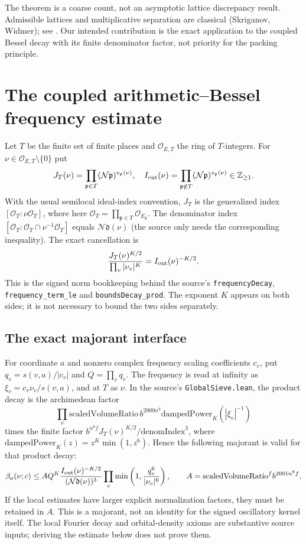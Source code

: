 \documentclass[11pt,a4paper]{article}
\newcommand{\N}{\mathcal N}\newcommand{\OO}{\mathcal O}\newcommand{\KK}{\mathscr K}\newcommand{\Tr}{\operatorname{tr}}\newcommand{\rk}{\operatorname{rank}}\newcommand{\len}{\operatorname{length}}\newcommand{\diag}{\operatorname{diag}}\newcommand{\vol}{\operatorname{vol}}\newcommand{\Id}{\mathrm I}\newcommand{\vG}{v_{\mathrm G}}\newcommand{\supp}{\operatorname{supp}}\newcommand{\status}[1]{\par\smallskip\noindent\textit{Status.} #1\par\smallskip}
\begin{document}
The theorem is a coarse count, not an asymptotic lattice discrepancy result. Admissible lattices and multiplicative separation are classical (Skriganov, Widmer); see \cite{skriganov,widmerweak,widmercount,barroero}. Our intended contribution is the exact application to the coupled Bessel decay with its finite denominator factor, not priority for the packing principle.

\section{The coupled arithmetic--Bessel frequency estimate}\label{sec:kernel}
Let $T$ be the finite set of finite places and $\OO_{E,T}$ the ring of $T$-integers. For $\nu\in\OO_{E,T}\setminus\{0\}$ put
\[
J_T(\nu)=\prod_{\mathfrak p\in T}(\N\mathfrak p)^{v_{\mathfrak p}(\nu)},\quad I_{\rm out}(\nu)=\prod_{\mathfrak p\notin T}(\N\mathfrak p)^{v_{\mathfrak p}(\nu)}\in\mathbb Z_{\geq1}.
\]
With the usual semilocal ideal-index convention, $J_T$ is the generalized index $[\OO_T:\nu\OO_T]$, where here $\OO_T=\prod_{\mathfrak p\in T}\OO_{E_{\mathfrak p}}$. The denominator index $[\OO_T:\OO_T\cap\nu^{-1}\OO_T]$ equals $\N\mathfrak d(\nu)$ (the source only needs the corresponding inequality). The exact cancellation is
\begin{equation}\label{eq:cancel}
\frac{J_T(\nu)^{K/2}}{\prod_v|\nu_v|^K}=I_{\rm out}(\nu)^{-K/2}.
\end{equation}
This is the signed norm bookkeeping behind the source's \texttt{frequencyDecay}, \texttt{frequency\_\allowbreak term\_\allowbreak le} and \texttt{boundsDecay\_\allowbreak prod}. The exponent $K$ appears on both sides; it is not necessary to bound the two sides separately.

\subsection{The exact majorant interface}
For coordinate $a$ and nonzero complex frequency scaling coefficients $c_v$, put $q_v=s(v,a)/|c_v|$ and $Q=\prod_v q_v$. The frequency is read at infinity as $\xi_v=c_v\nu_v/s(v,a)$, and at $T$ as $\nu$. In the source's \texttt{GlobalSieve.lean}, the product decay is the archimedean factor
\[\prod_v \mathrm{scaledVolumeRatio}\,b^{2000 n^9} \mathrm{dampedPower}_K(|\xi_v|^{-1})\]
times the finite factor $b^{n^9f} J_T(\nu)^{K/2}/\mathrm{denomIndex}^3$, where $\mathrm{dampedPower}_K(z)=z^K\min(1,z^6)$. Hence the following majorant is valid for that product decay:
\begin{equation}\label{eq:beta}
\beta_a(\nu;c)\leq A Q^K\frac{I_{\rm out}(\nu)^{-K/2}}{(\N\mathfrak d(\nu))^3}\prod_v\min\left(1,\frac{q_v^6}{|\nu_v|^6}\right),\qquad A=\mathrm{scaledVolumeRatio}^f b^{2001n^9f}.
\end{equation}
If the local estimates have larger explicit normalization factors, they must be retained in $A$. This is a majorant, not an identity for the signed oscillatory kernel itself. The local Fourier decay and orbital-density axioms are substantive source inputs; deriving the estimate below does not prove them.
\end{document}
